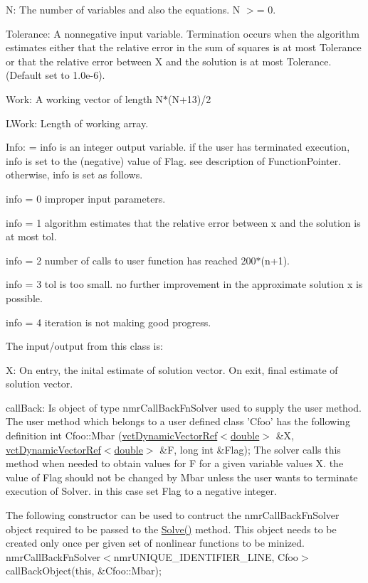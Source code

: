 \begin{DoxyItemize}
\item N\-: The number of variables and also the equations. N $>$= 0.
\item Tolerance\-: A nonnegative input variable. Termination occurs when the algorithm estimates either that the relative error in the sum of squares is at most Tolerance or that the relative error between X and the solution is at most Tolerance. (Default set to 1.\-0e-\/6).
\item Work\-: A working vector of length N$\ast$(N+13)/2
\item L\-Work\-: Length of working array.
\item Info\-: = info is an integer output variable. if the user has terminated execution, info is set to the (negative) value of Flag. see description of Function\-Pointer. otherwise, info is set as follows.

info = 0 improper input parameters.

info = 1 algorithm estimates that the relative error between x and the solution is at most tol.

info = 2 number of calls to user function has reached 200$\ast$(n+1).

info = 3 tol is too small. no further improvement in the approximate solution x is possible.

info = 4 iteration is not making good progress.
\end{DoxyItemize}

The input/output from this class is\-:
\begin{DoxyItemize}
\item X\-: On entry, the inital estimate of solution vector. On exit, final estimate of solution vector.
\item call\-Back\-: Is object of type nmr\-Call\-Back\-Fn\-Solver used to supply the user method. The user method which belongs to a user defined class 'Cfoo' has the following definition int Cfoo\-::\-Mbar (\hyperlink{classvct_dynamic_vector_ref}{vct\-Dynamic\-Vector\-Ref$<$double$>$} \&X, \hyperlink{classvct_dynamic_vector_ref}{vct\-Dynamic\-Vector\-Ref$<$double$>$} \&F, long int \&Flag); The solver calls this method when needed to obtain values for F for a given variable values X. the value of Flag should not be changed by Mbar unless the user wants to terminate execution of Solver. in this case set Flag to a negative integer.

The following constructor can be used to contruct the nmr\-Call\-Back\-Fn\-Solver object required to be passed to the \hyperlink{classnmr_fn_solver_aa11bd4b3ac560b2be8fa8c6ec1fd1f99}{Solve()} method. This object needs to be created only once per given set of nonlinear functions to be minized. nmr\-Call\-Back\-Fn\-Solver$<$nmr\-U\-N\-I\-Q\-U\-E\-\_\-\-I\-D\-E\-N\-T\-I\-F\-I\-E\-R\-\_\-\-L\-I\-N\-E, Cfoo$>$ call\-Back\-Object(this, \&\-Cfoo\-::\-Mbar);
\end{DoxyItemize}

